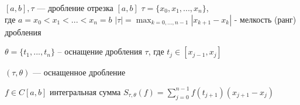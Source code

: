 \begin{definition}
    $[a, b], \tau $ --- дробление отрезка $[a, b]$ $\tau = \{ x_0, x_1, ..., x_n \}$, \\ где $a = x_0 < x_1 < ... < x_n = b$ \quad $|\tau| = \max_{k = 0, ..., n - 1}{|x_{k + 1} - x_k|}$ - мелкость (ранг) дробления

    $\theta = \{ t_1, ..., t_n\}$ -- оснащение дробления $\tau$, где $t_j \in [x_{j - 1}, x_j]$

    $(\tau, \theta) $ --- оснащенное дробление

    $f \in C[a, b]$ интегральная сумма $S_{\tau, \theta} (f) = \sum_{j = 0}^{n - 1} f(t_{j + 1}) (x_{j + 1} - x_j)$
\end{definition}



\quad


 

